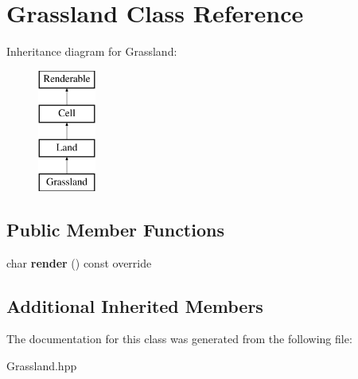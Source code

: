 \hypertarget{class_grassland}{}\section{Grassland Class Reference}
\label{class_grassland}
Inheritance diagram for Grassland\+:\begin{figure}[H]
\begin{center}
\leavevmode
\includegraphics[height=4.000000cm]{class_grassland}
\end{center}
\end{figure}
\subsection*{Public Member Functions}
\begin{DoxyCompactItemize}
\item 
\mbox{\label{class_grassland_a948f6818d400ac7a378d3ee16ed6527a}} 
char {\bfseries render} () const override
\end{DoxyCompactItemize}
\subsection*{Additional Inherited Members}


The documentation for this class was generated from the following file\+:\begin{DoxyCompactItemize}
\item 
Grassland.\+hpp\end{DoxyCompactItemize}
